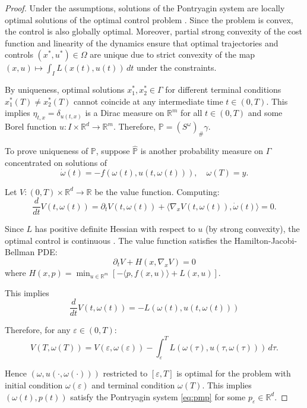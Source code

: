 \documentclass{article}
\begin{document}
\begin{proof}
Under the assumptions, solutions of the Pontryagin system are locally optimal solutions of the optimal control problem \citep[24.2 Corollary]{clarke2013functional}. Since the problem is convex, the control is also globally optimal. Moreover, partial strong convexity of the cost function and linearity of the dynamics ensure that optimal trajectories and controls $(x^*, u^*) \in \Omega$ are unique due to strict convexity of the map $(x,u) \mapsto \int_I L(x(t),u(t)) \, dt$ under the constraints.

By uniqueness, optimal solutions $x^*_1, x^*_2 \in \Gamma$ for different terminal conditions $x^*_1(T) \neq x^*_2(T)$ cannot coincide at any intermediate time $t \in (0,T)$. This implies $\eta_{t,x} = \delta_{u(t,x)}$ is a Dirac measure on $\mathbb{R}^m$ for all $t \in (0,T)$ and some Borel function $u: I \times \mathbb{R}^d \rightarrow \mathbb{R}^m$. Therefore, $\mathbb{P} = (S^{\omega})_{\#}\gamma$.

To prove uniqueness of $\mathbb{P}$, suppose $\hat{\mathbb{P}}$ is another probability measure on $\Gamma$ concentrated on solutions of
\begin{equation}
\label{eq:reverse-ode}
\dot{\omega}(t) = -f(\omega(t), u(t,\omega(t))), \quad \omega(T) = y.
\end{equation}

Let $V: (0,T) \times \mathbb{R}^d \rightarrow \mathbb{R}$ be the value function. Computing:
\[\frac{d}{dt}V(t,\omega(t)) = \partial_t V(t,\omega(t)) + \langle \nabla_x V(t,\omega(t)), \dot{\omega}(t) \rangle = 0.\]

Since $L$ has positive definite Hessian with respect to $u$ (by strong convexity), the optimal control is continuous \citep[Chapter III, Corollary 6.1]{fleming2012deterministic}. The value function satisfies the Hamilton-Jacobi-Bellman PDE:
\[\partial_t V + H(x, \nabla_x V) = 0\]
where $H(x,p) = \min_{u \in \mathbb{R}^m} [-\langle p, f(x,u) \rangle + L(x,u)]$.

This implies
\[\frac{d}{dt}V(t,\omega(t)) = -L(\omega(t), u(t,\omega(t)))\]

Therefore, for any $\varepsilon \in (0,T)$:
\[V(T,\omega(T)) = V(\varepsilon,\omega(\varepsilon)) - \int_\varepsilon^T L(\omega(\tau), u(\tau,\omega(\tau))) \, d\tau.\]

Hence $(\omega, u(\cdot,\omega(\cdot)))$ restricted to $[\varepsilon,T]$ is optimal for the problem with initial condition $\omega(\varepsilon)$ and terminal condition $\omega(T)$. This implies $(\omega(t), p(t))$ satisfy the Pontryagin system \eqref{eq:pmp} for some $p_\varepsilon \in \mathbb{R}^d$.


\end{proof}
\end{document}
